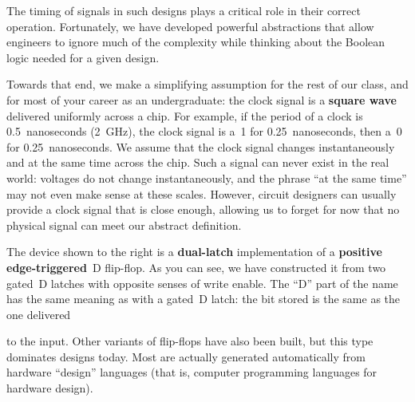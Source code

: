 The timing of signals in such designs plays a critical role in their
correct operation.  Fortunately, we have developed powerful abstractions 
that allow engineers to ignore much of the complexity while thinking
about the Boolean logic needed for a given design.

Towards that end, we make a simplifying assumption for the
rest of our class, and for most of your career as an undergraduate:
the clock signal is a {\bf square wave} delivered uniformly across a
chip.  For example, if the period of a clock is 0.5~nanoseconds (2~GHz),
the clock signal is a~1 for 0.25~nanoseconds, then a~0 for
0.25~nanoseconds.  We assume that the clock signal changes instantaneously
and at the same time across the chip.  Such a signal can never exist in
the real world: voltages do not change instantaneously, and the 
phrase ``at the same time'' may not even make sense at these scales.
However, circuit designers can usually provide a clock signal that
is close enough, allowing us to forget for now that no physical signal can
meet our abstract definition.

%
%

\begin{minipage}{2.3in}
%
%
The device shown to the right is a {\bf dual-latch} implementation of a 
{\bf positive edge-triggered}~D flip-flop.  As you can see, we have 
constructed it from two gated~D latches with opposite senses of write
enable.  The ``D'' part of the name has the same meaning as with a
gated~D latch: the bit stored is the same as the one delivered\linebreak
\end{minipage}\hspace{0.25in}%
\begin{minipage}{2.75in}
\vspace{12pt}
\end{minipage}\hspace{0.25in}%
\begin{minipage}{0.95in}
\vspace{12pt}
\end{minipage}\mpdone

to the
input.  Other variants of flip-flops have also been built, but this 
type dominates designs today.  Most are actually generated automatically
from hardware ``design'' languages (that is, computer programming languages
for hardware design).

